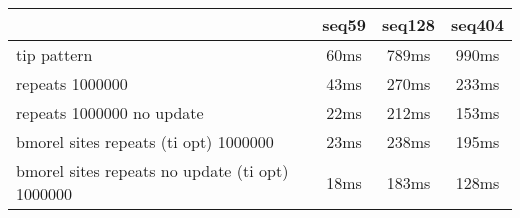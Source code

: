\begin{tabular}{|l|c|c|c|}
\hline
 & seq59 & seq128 & seq404  \\
\hline
tip pattern &  60ms &  789ms &  990ms\\
\hline
repeats 1000000 &  43ms &  270ms &  233ms\\
\hline
repeats 1000000 no update &  22ms &  212ms &  153ms\\
\hline
bmorel sites repeats (ti opt) 1000000 &  23ms &  238ms &  195ms\\
\hline
bmorel sites repeats no update (ti opt) 1000000 &  18ms &  183ms &  128ms\\
\hline
\end{tabular}
